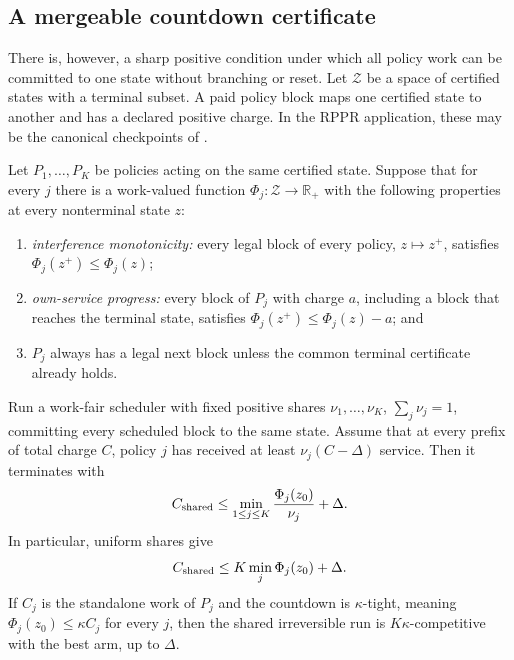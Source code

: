 \subsection{A mergeable countdown certificate}

There is, however, a sharp positive condition under which all policy work can
be committed to one state without branching or reset.  Let $\mathcal Z$ be a
space of certified states with a terminal subset.  A paid policy block maps
one certified state to another and has a declared positive charge.  In the
RPPR application, these may be the canonical checkpoints of
.

\begin{theorem}
\label{thm:mergeable-countdown}
Let $P_1,\ldots,P_K$ be policies acting on the same certified state.  Suppose
that for every $j$ there is a work-valued function
$\Phi_j:\mathcal Z\to\mathbb R_+$ with the following properties at every
nonterminal state $z$:
\begin{enumerate}[label=(\roman*),leftmargin=*]
 \item \emph{interference monotonicity:} every legal block of every policy,
 $z\mapsto z^+$, satisfies $\Phi_j(z^+)\leq\Phi_j(z)$;
 \item \emph{own-service progress:} every block of $P_j$ with charge $a$,
 including a block that reaches the terminal state, satisfies
 $\Phi_j(z^+)\leq\Phi_j(z)-a$; and
 \item $P_j$ always has a legal next block unless the common terminal
 certificate already holds.
\end{enumerate}
Run a work-fair scheduler with fixed positive shares
$\nu_1,\ldots,\nu_K$, $\sum_j\nu_j=1$, committing every scheduled block to
the same state.  Assume that at every prefix of total charge $C$, policy $j$
has received at least $\nu_j(C-\Delta)$ service.  Then it terminates with
\begin{equation}
 C_{\rm shared}
 \leq
 \min_{1\leq j\leq K}
 \frac{\Phi_j(z_0)}{\nu_j}+\Delta.
 \label{eq:mergeable-countdown-bound}
\end{equation}
In particular, uniform shares give
\begin{equation}
 C_{\rm shared}
 \leq K\min_j\Phi_j(z_0)+\Delta.
 \label{eq:mergeable-uniform}
\end{equation}
If $C_j$ is the standalone work of $P_j$ and the countdown is
$\kappa$-tight, meaning $\Phi_j(z_0)\leq\kappa C_j$ for every $j$, then the
shared irreversible run is $K\kappa$-competitive with the best arm, up to
$\Delta$.
\end{theorem}

